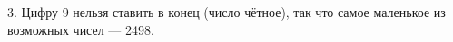 3. Цифру 9 нельзя ставить в конец (число чётное), так что самое маленькое из возможных чисел --- 2498.\\

